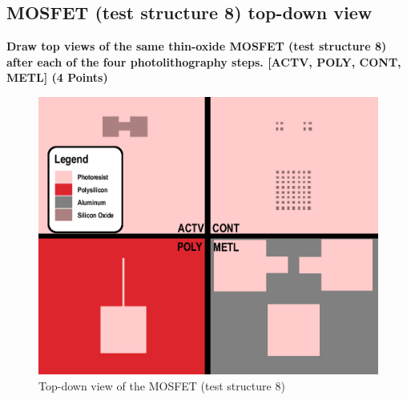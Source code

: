 \documentclass{article}
\begin{document}
\subsection{MOSFET (test structure 8) top-down view}
\textbf{Draw top views of the same thin-oxide MOSFET (test structure 8) after each of the
four photolithography steps. [ACTV, POLY, CONT, METL] (4 Points)}
\begin{figure}[H]
\centering
\includegraphics[width=350pt]{CrossSections/MOSFETlabprofiles/MOSFET_TOPDOWN.png}
\caption{Top-down view of the MOSFET (test structure 8)}
\end{figure}
\end{document}
